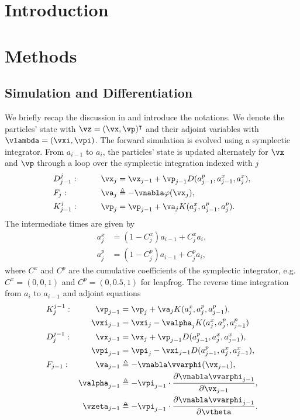 \documentclass[usenatbib]{mnras}
\newcommand{\p}{\partial}
\begin{document}
\section{Introduction}


\section{Methods}


\subsection{Simulation and Differentiation}

We briefly recap the discussion in \citet{Li2022a} and introduce the notations.
We denote the particles' state with $\vz = (\vx, \vp)^\intercal$ and their
adjoint variables with $\vlambda = (\vxi, \vpi)$.
The forward simulation is evolved using a symplectic integrator.
From $a_{i-1}$ to $a_i$, the particles' state is updated alternately for $\vx$
and $\vp$ through a loop over the symplectic integration indexed with $j$
\begin{alignat}{2}
&D_{j-1}^j: &\qquad \vx_j &= \vx_{j-1} +
  \vp_{j-1} D(a^p_{j-1}, a^x_{j-1}, a^x_j), \nonumber\\
%
&F_j: & \va_j &\triangleq -\vnabla\varphi(\vx_j), \nonumber\\
%
&K_{j-1}^j: & \vp_j &= \vp_{j-1} + \va_j K(a^x_j, a^p_{j-1}, a^p_j).
\label{DFK}
\end{alignat}
The intermediate times are given by
\begin{align}
a^x_j &= (1 - C^x_j) a_{i-1} + C^x_j a_i, \nonumber\\
a^p_j &= (1 - C^p_j) a_{i-1} + C^p_j a_i,
\end{align}
where $C^x$ and $C^p$ are the cumulative coefficients of the symplectic
integrator, e.g. $C^x = (0, 0, 1)$ and $C^p = (0, 0.5, 1)$ for leapfrog.
The reverse time integration from $a_i$ to $a_{i-1}$ and adjoint equations
\begin{alignat}{2}
&K_j^{j-1}: &\qquad \vp_{j-1} &= \vp_j +
  \va_j K(a^x_j, a^p_j, a^p_{j-1}), \nonumber\\
%
& & \vxi_{j-1} &= \vxi_j - \valpha_j K(a^x_j, a^p_j, a^p_{j-1}) \nonumber\\
%
&D_j^{j-1}: & \vx_{j-1} &= \vx_j +
  \vp_{j-1} D(a^p_{j-1}, a^x_j, a^x_{j-1}), \nonumber\\
%
& & \vpi_{j-1} &= \vpi_j - \vxi_{j-1} D(a^p_{j-1}, a^x_j, a^x_{j-1}), \nonumber\\
%
&F_{j-1}: & \va_{j-1} &\triangleq -\vnabla\vvarphi(\vx_{j-1}), \nonumber\\
%
& & \valpha_{j-1} &\triangleq -\vpi_{j-1} \cdot
  \frac{\p\vnabla\vvarphi_{j-1}}{\p\vx_{j-1}}, \nonumber\\
& & \vzeta_{j-1} &\triangleq - \vpi_{j-1} \cdot
  \frac{\p\vnabla\vvarphi_{j-1}}{\p\vtheta}.
\label{KDF_adj}
\end{alignat}
\end{document}
